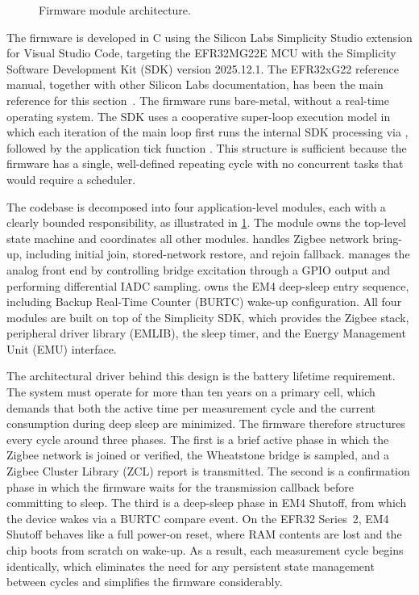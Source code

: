 \begin{figure}[!b]
\centering

    \caption{Firmware module architecture.}
    \label{fig:fw_architecture}
\end{figure}

The firmware is developed in C using the Silicon Labs Simplicity Studio extension for Visual Studio Code, targeting the EFR32MG22E MCU with the Simplicity Software Development Kit (SDK) version 2025.12.1. The EFR32xG22 reference manual, together with other Silicon Labs documentation, has been the main reference for this section~\cite{silabs_efr32xg22_reference, silabs_efr32xg22_wireless, silabs_Zigbee_EmberZNet_PRO,Simplicity_Studio_6_Overview}. The firmware runs bare-metal, without a real-time operating system.
The SDK uses a cooperative super-loop execution model in which each iteration of the main loop first runs the internal SDK processing via , followed by the application tick function .
This structure is sufficient because the firmware has a single, well-defined repeating cycle with no concurrent tasks that would require a scheduler.
 
The codebase is decomposed into four application-level modules, each with a clearly bounded responsibility, as illustrated in \cref{fig:fw_architecture}.
The module  owns the top-level state machine and coordinates all other modules.
 handles Zigbee network bring-up, including initial join, stored-network restore, and rejoin fallback.
 manages the analog front end by controlling bridge excitation through a GPIO output and performing differential IADC sampling.
 owns the EM4 deep-sleep entry sequence, including Backup Real-Time Counter (BURTC) wake-up configuration.
All four modules are built on top of the Simplicity SDK, which provides the Zigbee stack, peripheral driver library (EMLIB), the sleep timer, and the Energy Management Unit (EMU) interface.

The architectural driver behind this design is the battery lifetime requirement.
The system must operate for more than ten years on a primary cell, which demands that both the active time per measurement cycle and the current consumption during deep sleep are minimized.
The firmware therefore structures every cycle around three phases.
The first is a brief active phase in which the Zigbee network is joined or verified, the Wheatstone bridge is sampled, and a Zigbee Cluster Library (ZCL) report is transmitted.
The second is a confirmation phase in which the firmware waits for the transmission callback before committing to sleep.
The third is a deep-sleep phase in EM4 Shutoff, from which the device wakes via a BURTC compare event.
On the EFR32 Series~2, EM4 Shutoff behaves like a full power-on reset, where RAM contents are lost and the chip boots from scratch on wake-up. As a result, each measurement cycle begins identically, which eliminates the need for any persistent state management between cycles and simplifies the firmware considerably.

